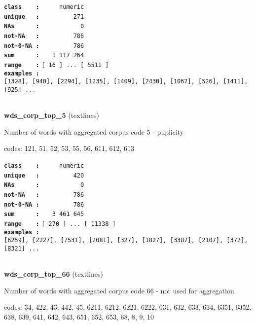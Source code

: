 \documentclass[]{article}
\begin{document}
\textbf{\texttt{class\ \ \ \ :}} \texttt{~~~~~numeric}\\
\textbf{\texttt{unique\ \ \ :}} \texttt{~~~~~~~~~271}\\
\textbf{\texttt{NAs\ \ \ \ \ \ :}} \texttt{~~~~~~~~~~~0}\\
\textbf{\texttt{not-NA\ \ \ :}} \texttt{~~~~~~~~~786}\\
\textbf{\texttt{not-0-NA\ :}} \texttt{~~~~~~~~~786}\\
\textbf{\texttt{sum\ \ \ \ \ \ :}} \texttt{~~~1~117~264}\\
\textbf{\texttt{range\ \ \ \ :}}
\texttt{{[}\ 16\ {]}\ ...\ {[}\ 5511\ {]}}\\
\textbf{\texttt{examples\ :}}
\texttt{{[}1328{]},\ {[}940{]},\ {[}2294{]},\ {[}1235{]},\ {[}1409{]},\ {[}2430{]},\ {[}1067{]},\ {[}526{]},\ {[}1411{]},\ {[}925{]}\ ...}\\

~

\textbf{wds\_corp\_top\_5} (textlines)

Number of words with aggregated corpus code 5 - puplicity

codes: 121, 51, 52, 53, 55, 56, 611, 612, 613

\textbf{\texttt{class\ \ \ \ :}} \texttt{~~~~~numeric}\\
\textbf{\texttt{unique\ \ \ :}} \texttt{~~~~~~~~~420}\\
\textbf{\texttt{NAs\ \ \ \ \ \ :}} \texttt{~~~~~~~~~~~0}\\
\textbf{\texttt{not-NA\ \ \ :}} \texttt{~~~~~~~~~786}\\
\textbf{\texttt{not-0-NA\ :}} \texttt{~~~~~~~~~786}\\
\textbf{\texttt{sum\ \ \ \ \ \ :}} \texttt{~~~3~461~645}\\
\textbf{\texttt{range\ \ \ \ :}}
\texttt{{[}\ 270\ {]}\ ...\ {[}\ 11338\ {]}}\\
\textbf{\texttt{examples\ :}}
\texttt{{[}6259{]},\ {[}2227{]},\ {[}7531{]},\ {[}2081{]},\ {[}327{]},\ {[}1827{]},\ {[}3387{]},\ {[}2107{]},\ {[}372{]},\ {[}8321{]}\ ...}\\

~

\textbf{wds\_corp\_top\_66} (textlines)

Number of words with aggregated corpus code 66 - not used for
aggregation

codes: 34, 422, 43, 442, 45, 6211, 6212, 6221, 6222, 631, 632, 633, 634,
6351, 6352, 638, 639, 641, 642, 643, 651, 652, 653, 68, 8, 9, 10
\end{document}
